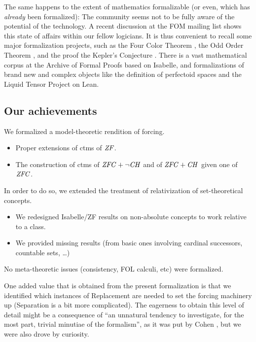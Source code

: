 The same happens to the extent of mathematics formalizable (or even,
which has \emph{already} been formalized): The community seems not to
be fully aware of the potential of the technology. A recent discussion
at the FOM mailing list shows this state of affairs within our fellow
logicians. It is thus convenient to recall
some major formalization projects, such as the Four Color Theorem
\cite{MR2463991}, the Odd Order Theorem
\cite{10.1007/978-3-642-39634-2_14}, and the proof the Kepler's
Conjecture \cite{MR3659768}. There is a vast mathematical corpus at
the Archive of Formal Proofs based on Isabelle, and formalizations of
brand new and complex objects like the definition of perfectoid spaces
and the Liquid Tensor Project \cite{LTE2020,LTE2021} on Lean.

\subsection{Our achievements}
We formalized a model-theoretic rendition of forcing.
\begin{itemize}
\item Proper extensions of ctms of $\mathit{ZF}$.
\item The construction of ctms of $\mathit{ZFC} + \neg\mathit{CH}$ and of $\mathit{ZFC} + \mathit{CH}$ given one of
  $\mathit{ZFC}$.
\end{itemize}

In order to do so, we extended the treatment of relativization of
set-theoretical concepts. 
\begin{itemize}
\item We redesigned Isabelle/ZF results on non-absolute concepts to work
  relative to a class.
\item We provided missing results (from basic ones involving cardinal
  successors, countable sets, \dots)
\end{itemize}
No meta-theoretic issues (consistency, FOL calculi, etc) were formalized.

One added value that is obtained from the present formalization is
that we identified which instances of  Replacement are
needed to set the forcing machinery up (Separation is a bit more
complicated).
The eagerness to obtain this level of detail might be a consequence of
“an unnatural tendency to investigate, for the most part, trivial
minutiae of the formalism”, as it was put by Cohen
\cite{zbMATH02012060}, but we were also drove by curiosity.

